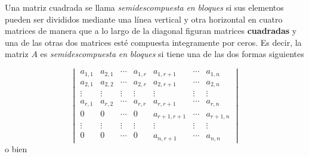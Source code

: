 \documentclass[
]{article}
\begin{document}
Una matriz cuadrada se llama \emph{semidescompuesta} \emph{en}
\emph{bloques} si sus elementos pueden ser divididos mediante una línea
vertical y otra horizontal en cuatro matrices de manera que a lo largo
de la diagonal figuran matrices \textbf{cuadradas} y una de las otras
dos matrices esté compuesta integramente por ceros. Es decir, la matriz
\(A\) es \emph{semidescompuesta} \emph{en} \emph{bloques} si tiene una
de las dos formas siguientes

\begin{equation}
  \begin{vmatrix}
     a_{1,1}        &a_{2,1}    & \cdots     & a_{1,r}  & a_{1,r+1}     & \cdots     & a_{1,n}      \\ 
     a_{2,1}        &a_{2,2}    & \cdots     & a_{2,r}  & a_{2,r+1}     & \cdots     & a_{2,n}      \\
     \vdots         & \vdots    & \vdots     &  \vdots  &  \vdots       & \vdots     & \vdots      \\  
     a_{r,1}        &a_{r,2}    &\cdots      & a_{r,r}  & a_{r,r+1}     & \cdots     & a_{r,n}      \\
     0              &0          & \cdots     & 0        & a_{r+1,r+1}   & \cdots     & a_{r+1,n}      \\
     \vdots         & \vdots    & \vdots     &  \vdots  &  \vdots       & \vdots     & \vdots      \\
     0              &0          & \cdots     & 0        & a_{n,r+1}     & \cdots     & a_{n,n} 
  \end{vmatrix}
\end{equation} o bien
\end{document}
